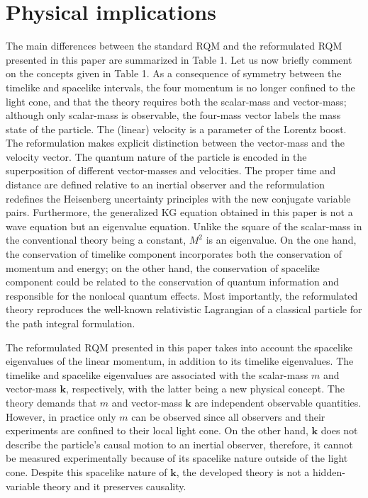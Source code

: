 \documentclass[12pt]{iopart}
\begin{document}
\section{Physical implications}

The main differences between the standard RQM and the reformulated RQM presented 
in this paper are summarized in Table 1.  Let us now briefly comment on the concepts 
given in Table 1.  As a consequence of symmetry between the timelike and spacelike 
intervals, the four momentum is no longer confined to the light cone, and that the 
theory requires both the scalar-mass and vector-mass; although only scalar-mass is 
observable, the four-mass vector labels the mass state of the particle.  The (linear) 
velocity is a parameter of the Lorentz boost.  The reformulation makes explicit 
distinction between the vector-mass and the velocity vector.  The quantum nature 
of the particle is encoded in the superposition of different vector-masses and velocities. 
The proper time and distance are defined relative to an inertial observer and the 
reformulation redefines the Heisenberg uncertainty principles with the new conjugate 
variable pairs.  Furthermore, the generalized KG equation obtained in this paper is not 
a wave equation but an eigenvalue equation. Unlike the square of the scalar-mass in 
the conventional theory being a constant, $M^2$ is an eigenvalue.  On the one hand, 
the conservation of timelike component incorporates both the conservation of momentum 
and energy; on the other hand, the conservation of spacelike component could be related 
to the conservation of quantum information and responsible for the nonlocal quantum 
effects. Most importantly, the reformulated theory reproduces the well-known relativistic 
Lagrangian of a classical particle for the path integral formulation.

The reformulated RQM presented in this paper takes into account the spacelike eigenvalues 
of the linear momentum, in addition to its timelike eigenvalues.  The timelike and spacelike 
eigenvalues are associated with the scalar-mass $m$ and vector-mass $\boldsymbol{k}$, 
respectively, with the latter being a new physical concept.  The theory demands that $m$ 
and vector-mass $\boldsymbol{k}$ are independent observable quantities.  However, in 
practice only $m$ can be observed since all observers and their experiments are confined 
to their local light cone.  On the other hand, $\boldsymbol{k}$ does not describe the 
particle's causal motion to an inertial observer, therefore, it cannot be measured 
experimentally because of its spacelike nature outside of the light cone.  Despite this 
spacelike nature of $\boldsymbol{k}$, the developed theory is not a hidden-variable
theory and it preserves causality.  
\end{document}
